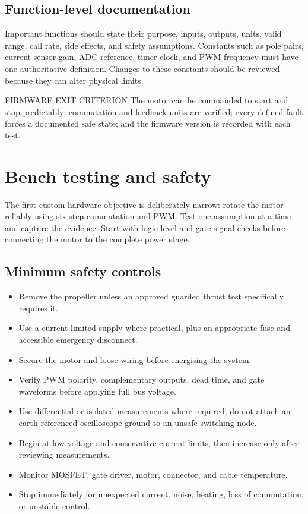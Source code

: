 \documentclass[11pt,a4paper]{article}
\begin{document}
\subsection{Function-level documentation}

Important functions should state their purpose, inputs, outputs, units, valid
range, call rate, side effects, and safety assumptions. Constants such as pole
pairs, current-sensor gain, ADC reference, timer clock, and PWM frequency must
have one authoritative definition. Changes to these constants should be
reviewed because they can alter physical limits.

\begin{callout}{FIRMWARE EXIT CRITERION}
  The motor can be commanded to start and stop predictably; commutation and
  feedback units are verified; every defined fault forces a documented safe
  state; and the firmware version is recorded with each test.
\end{callout}

\section{Bench testing and safety}

The first custom-hardware objective is deliberately narrow: rotate the motor
reliably using six-step commutation and PWM. Test one assumption at a time and
capture the evidence. Start with logic-level and gate-signal checks before
connecting the motor to the complete power stage.

\subsection{Minimum safety controls}

\begin{itemize}
  \item Remove the propeller unless an approved guarded thrust test specifically requires it.
  \item Use a current-limited supply where practical, plus an appropriate fuse and accessible emergency disconnect.
  \item Secure the motor and loose wiring before energising the system.
  \item Verify PWM polarity, complementary outputs, dead time, and gate waveforms before applying full bus voltage.
  \item Use differential or isolated measurements where required; do not attach an earth-referenced oscilloscope ground to an unsafe switching node.
  \item Begin at low voltage and conservative current limits, then increase only after reviewing measurements.
  \item Monitor MOSFET, gate driver, motor, connector, and cable temperature.
  \item Stop immediately for unexpected current, noise, heating, loss of commutation, or unstable control.
\end{itemize}
\end{document}
